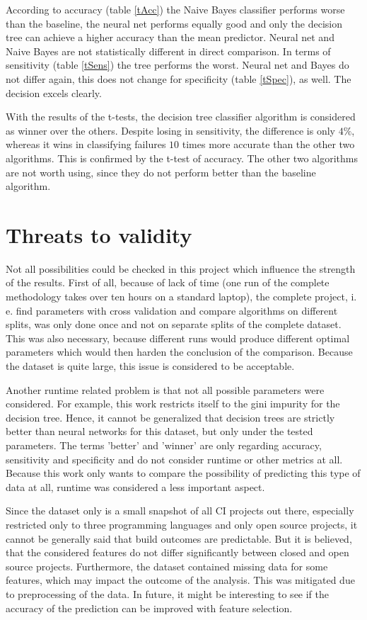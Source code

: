 \documentclass[a4paper,11pt]{article}
\begin{document}
According to accuracy (table \ref{tAcc}) the Naive Bayes classifier performs worse than the baseline, the neural net performs equally good and only the decision tree can achieve a higher accuracy than the mean predictor. Neural net and Naive Bayes are not statistically different in direct comparison. 
In terms of sensitivity (table \ref{tSens}) the tree performs the worst. Neural net and Bayes do not differ again, this does not change for specificity (table \ref{tSpec}), as well. The decision excels clearly. 

With the results of the t-tests, the decision tree classifier algorithm is considered as winner over the others. Despite losing in sensitivity, the difference is only $4\%$, whereas it wins in classifying failures $10$ times more accurate than the other two algorithms. This is confirmed by the t-test of accuracy. The other two algorithms are not worth using, since they do not perform better than the baseline algorithm. 

\section{Threats to validity}

Not all possibilities could be checked in this project which influence the strength of the results. 
First of all, because of lack of time (one run of the complete methodology takes over ten hours on a standard laptop), the complete project, i. e. find parameters with cross validation and compare algorithms on different splits, was only done once and not on separate splits of the complete dataset. This was also necessary, because different runs would produce different optimal parameters which would then harden the conclusion of the comparison. Because the dataset is quite large, this issue is considered to be acceptable. 

Another runtime related problem is that not all possible parameters were considered. For example, this work restricts itself to the gini impurity for the decision tree. Hence, it cannot be generalized that decision trees are strictly better than neural networks for this dataset, but only under the tested parameters. The terms 'better' and 'winner' are only regarding accuracy, sensitivity and specificity and do not consider runtime or other metrics at all. Because this work only wants to compare the possibility of predicting this type of data at all, runtime was considered a less important aspect. 

Since the dataset only is a small snapshot of all CI projects out there, especially restricted only to three programming languages and only open source projects, it cannot be generally said that build outcomes are predictable. But it is believed, that the considered features do not differ significantly between closed and open source projects. Furthermore, the dataset contained missing data for some features, which may impact the outcome of the analysis. This was mitigated due to preprocessing of the data. In future, it might be interesting to see if the accuracy of the prediction can be improved with feature selection. 
\end{document}
